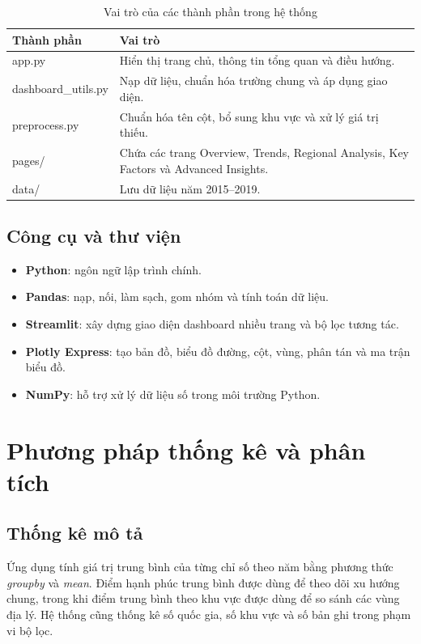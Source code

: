 \begin{table}[H]
\centering
\begin{tabular}{|p{4cm}|p{8.5cm}|}
\hline
\textbf{Thành phần} & \textbf{Vai trò} \\
\hline
app.py & Hiển thị trang chủ, thông tin tổng quan và điều hướng. \\
\hline
dashboard\_utils.py & Nạp dữ liệu, chuẩn hóa trường chung và áp dụng giao diện. \\
\hline
preprocess.py & Chuẩn hóa tên cột, bổ sung khu vực và xử lý giá trị thiếu. \\
\hline
pages/ & Chứa các trang Overview, Trends, Regional Analysis, Key Factors và Advanced Insights. \\
\hline
data/ & Lưu dữ liệu năm 2015--2019. \\
\hline
\end{tabular}
\caption{Vai trò của các thành phần trong hệ thống}
\label{tab:thanh-phan-he-thong}
\end{table}

\subsection{Công cụ và thư viện}

\begin{itemize}
    \item \textbf{Python}: ngôn ngữ lập trình chính.
    \item \textbf{Pandas}: nạp, nối, làm sạch, gom nhóm và tính toán dữ liệu.
    \item \textbf{Streamlit}: xây dựng giao diện dashboard nhiều trang và bộ lọc tương tác.
    \item \textbf{Plotly Express}: tạo bản đồ, biểu đồ đường, cột, vùng, phân tán và ma trận biểu đồ.
    \item \textbf{NumPy}: hỗ trợ xử lý dữ liệu số trong môi trường Python.
\end{itemize}

\section{Phương pháp thống kê và phân tích}

\subsection{Thống kê mô tả}

Ứng dụng tính giá trị trung bình của từng chỉ số theo năm bằng phương thức \textit{groupby} và \textit{mean}. Điểm hạnh phúc trung bình được dùng để theo dõi xu hướng chung, trong khi điểm trung bình theo khu vực được dùng để so sánh các vùng địa lý. Hệ thống cũng thống kê số quốc gia, số khu vực và số bản ghi trong phạm vi bộ lọc.

